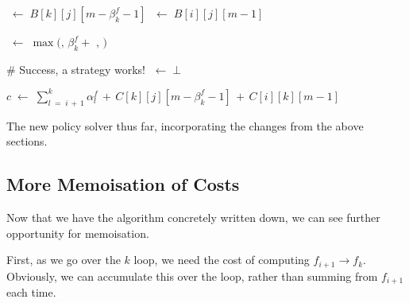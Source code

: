 \begin{algorithm}[htbp]
{{{{                    
                    \BlankLine

                    \PeakR \(\;\leftarrow\; B[k][j][m-\beta^f_k-1]\)\;
                    \PeakL \(\;\leftarrow\; B[i][j][m-1]\)\;
                    \BlankLine

                    \BlankLine

                    \Peak \(\;\leftarrow\; \max( \)\PeakFs\(,\, \beta^f_k + \) \PeakR\(,\,\)\PeakL\( ) \)\;
                    \BlankLine

                    \BlankLine

                    \# Success, a strategy works!\;
                    \Failed\(\;\leftarrow\; \bot\)\;
                    \BlankLine

                    \(c \;\leftarrow\; \sum_{l\;=\;i\,+\,1}^k \alpha^f_l \,+\, C[k][j][m-\beta^f_k-1] \,+\, C[i][k][m-1]\)\;
                    \BlankLine

                }
            }
        }
    }
    
    \caption{The new policy solver thus far, incorporating the changes from the above sections.}
    \label{alg:3-policy-solver-intermediate}
\end{algorithm}

\subsection{More Memoisation of Costs}
Now that we have the algorithm concretely written down, we can see further opportunity for memoisation.

First, as we go over the \(k\) loop, we need the cost of computing \(f_{i+1}\rightarrow f_k\).
Obviously, we can accumulate this over the loop, rather than summing from \(f_{i+1}\) each time.

